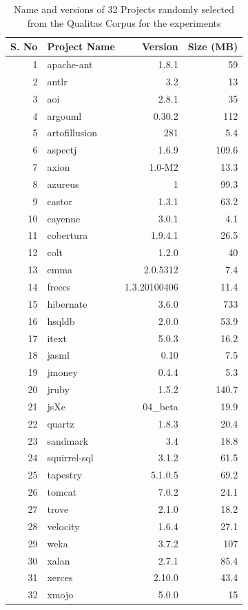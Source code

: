 \begin{table}[htp]
\caption{Name and versions of 32 Projects randomly selected from the Qualitas Corpus for the experiments}
\centering
\begin{tabular}{|r|l|r|r|}
\hline
S. No& 	Project Name	& 	Version		&	Size (MB)\\
\hline
1	&	apache-ant	&	1.8.1			&	59\\
2	&	antlr			&	3.2			&	13\\
3	&	aoi			&	2.8.1			&	35\\
4	&	argouml		&	0.30.2		&	112\\
5	&	artofillusion	&	281			&	5.4\\
6	&	aspectj		&	1.6.9			&	109.6\\
7	&	axion		&	1.0-M2		&	13.3\\
8	&	azureus		&	1			&	99.3\\
9	&	castor		&	1.3.1			&	63.2\\
10	&	cayenne		&	3.0.1			&	4.1\\
11	&	cobertura		&	1.9.4.1		&	26.5\\
12	&	colt			&	1.2.0			&	40\\
13	&	emma		&	2.0.5312		&	7.4\\
14	&	freecs		&	1.3.20100406	&	11.4\\
15	&	hibernate		&	3.6.0			&	733\\
16	&	hsqldb		&	2.0.0			&	53.9\\
17	&	itext			&	5.0.3			&	16.2\\
18	&	jasml		&	0.10			&	7.5 \\
19	&	jmoney		&	0.4.4			&	5.3\\
20	&	jruby			&	1.5.2			&	140.7\\
21	&	jsXe			&	04\_beta		&	19.9\\
22	&	quartz		&	1.8.3			&	20.4\\
23	&	sandmark		&	3.4			&	18.8\\
24	&	squirrel-sql	&	3.1.2			&	61.5\\
25	&	tapestry		&	5.1.0.5		&	69.2\\
26	&	tomcat		&	7.0.2			&	24.1\\
27	&	trove			&	2.1.0			&	18.2\\
28	&	velocity		&	1.6.4			&	27.1\\
29	&	weka		&	3.7.2			&	107\\
30	&	xalan		&	2.7.1			&	85.4\\
31	&	xerces		&	2.10.0		&	43.4\\
32	&	xmojo		&	5.0.0			&	15\\
\hline
\end{tabular}
\bigskip
\label{table:projects}
\end{table}



